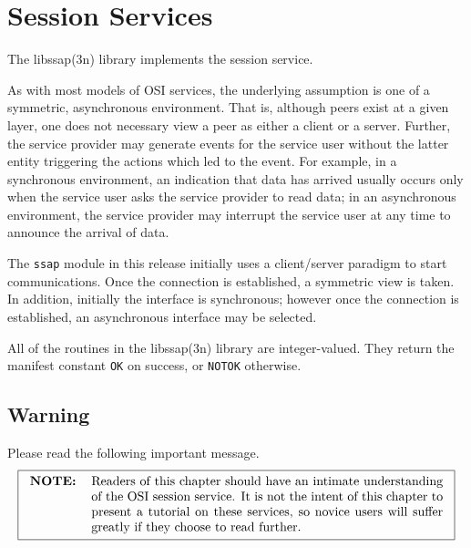 
\chapter	{Session Services}\label{libssap}
The \man libssap(3n) library implements the session service.

As with most models of OSI services,
the underlying assumption is one of a symmetric, asynchronous environment.
That is,
although peers exist at a given layer,
one does not necessary view a peer as either a client or a server.
Further,
the service provider may generate events for the service user without the
latter entity triggering the actions which led to the event.
For example,
in a synchronous environment,
an indication that data has arrived usually occurs only when the service user
asks the service provider to read data;
in an asynchronous environment,
the service provider may interrupt the service user at any time to announce
the arrival of data.

The \verb"ssap" module in this release initially uses a client/server
paradigm to start communications.
Once the connection is established,
a symmetric view is taken.
In addition,
initially the interface is synchronous;
however once the connection is established,
an asynchronous interface may be selected.

All of the routines in the \man libssap(3n) library are integer-valued.
They return the manifest constant \verb"OK" on success,
or \verb"NOTOK" otherwise.

\section	{Warning}
Please read the following important message.
\[\fbox{\begin{tabular}{lp{0.8\textwidth}}
\bf NOTE:&	Readers of this chapter should have an intimate understanding
		of the OSI session service.  It is not the intent of this
		chapter to present a tutorial on these services, so novice
		users will suffer greatly if they choose to read further.
\end{tabular}}\]

